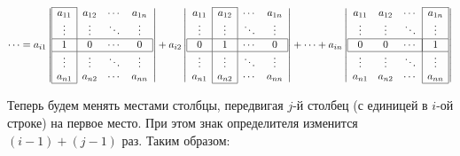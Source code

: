 $$
\cdots =
a_{i1}\left|
\begin{array}{|c|ccc}
\cline{1-1}
a_{11} & a_{12} & \cdots & a_{1n} \\
\vdots & \vdots & \ddots & \vdots \\
\hline
\multicolumn{1}{|c|}{1} & 0 & \cdots &\multicolumn{1}{c|}{0}\\
\hline
\vdots & \vdots & \ddots & \vdots \\
a_{n1} & a_{n2} & \cdots & a_{nn} \\
\cline{1-1}
\end{array}\right|
+
a_{i2}\left|
\begin{array}{c|c|cc}
\cline{2-2}
a_{11} & a_{12} & \cdots & a_{1n} \\
\vdots & \vdots & \ddots & \vdots \\
\hline
\multicolumn{1}{|c}{0} & \multicolumn{1}{|c|}{1} & \cdots &\multicolumn{1}{c|}{0}\\
\hline
\vdots & \vdots & \ddots & \vdots \\
a_{n1} & a_{n2} & \cdots & a_{nn} \\
\cline{2-2}
\end{array}\right|
+
\cdots
+
a_{in}\left|
\begin{array}{ccc|c|}
\cline{4-4}
a_{11} & a_{12} & \cdots & a_{1n} \\
\vdots & \vdots & \ddots & \vdots \\
\hline
\multicolumn{1}{|c}{0} & 0 & \cdots &\multicolumn{1}{|c|}{1}\\
\hline
\vdots & \vdots & \ddots & \vdots \\
a_{n1} & a_{n2} & \cdots & a_{nn} \\
\cline{4-4}
\end{array}\right|
$$

Теперь будем менять местами столбцы, передвигая $j$-й столбец (с
единицей в $i$-ой строке) на первое место. При этом знак определителя
изменится $(i-1)+(j-1)$ раз. Таким образом:

